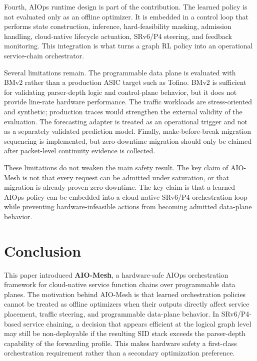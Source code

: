 \documentclass[final,5p]{elsarticle}
\begin{document}
Fourth, AIOps runtime design is part of the contribution. The learned policy is not evaluated only as an offline optimizer. It is embedded in a control loop that performs state construction, inference, hard-feasibility masking, admission handling, cloud-native lifecycle actuation, SRv6/P4 steering, and feedback monitoring. This integration is what turns a graph RL policy into an operational service-chain orchestrator.

Several limitations remain. The programmable data plane is evaluated with BMv2 rather than a production ASIC target such as Tofino. BMv2 is sufficient for validating parser-depth logic and control-plane behavior, but it does not provide line-rate hardware performance. The traffic workloads are stress-oriented and synthetic; production traces would strengthen the external validity of the evaluation. The forecasting adapter is treated as an operational trigger and not as a separately validated prediction model. Finally, make-before-break migration sequencing is implemented, but zero-downtime migration should only be claimed after packet-level continuity evidence is collected.

These limitations do not weaken the main safety result. The key claim of AIO-Mesh is not that every request can be admitted under saturation, or that migration is already proven zero-downtime. The key claim is that a learned AIOps policy can be embedded into a cloud-native SRv6/P4 orchestration loop while preventing hardware-infeasible actions from becoming admitted data-plane behavior.

\section{Conclusion}
\label{sec:conclusion}

This paper introduced \textbf{AIO-Mesh}, a hardware-safe AIOps orchestration framework for cloud-native service function chains over programmable data planes. The motivation behind AIO-Mesh is that learned orchestration policies cannot be treated as offline optimizers when their outputs directly affect service placement, traffic steering, and programmable data-plane behavior. In SRv6/P4-based service chaining, a decision that appears efficient at the logical graph level may still be non-deployable if the resulting SID stack exceeds the parser-depth capability of the forwarding profile. This makes hardware safety a first-class orchestration requirement rather than a secondary optimization preference.
\end{document}
